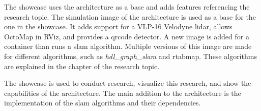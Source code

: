 The showcase uses the architecture as a base and adds features referencing the research topic. The simulation image of the architecture is used as a base for the one in the showcase. It adds support for a VLP-16 Velodyne \acs{lidar}, allows OctoMap in RViz, and provides a \acs{qrcode} detector. A new image is added for a container than runs a \acs{slam} algorithm. Multiple versions of this image are made for different algorithms, such as \textit{hdl\_graph\_slam} and \acs{rtabmap}. These algorithms are explained in the chapter of the research topic.

The showcase is used to conduct research, visualize this research, and show the capabilities of the architecture. The main addition to the architecture is the implementation of the \acs{slam} algorithms and their dependencies.